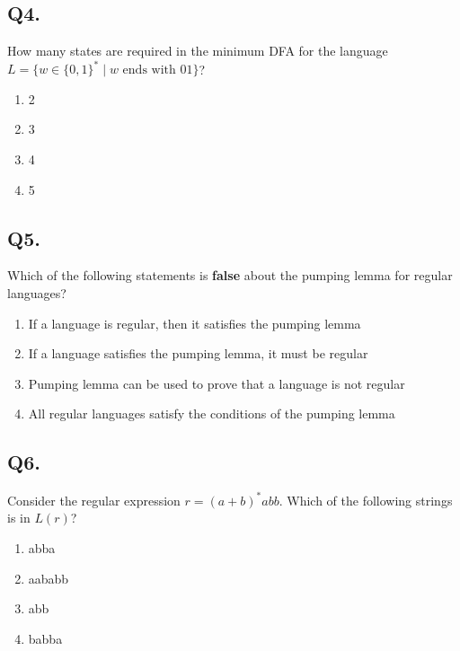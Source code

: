 \vspace{1em}

\subsection*{Q4.}
How many states are required in the minimum DFA for the language $L = \{ w \in \{0,1\}^* \mid w \text{ ends with 01} \}$?

\begin{enumerate}[label=(\alph*)]
    \item 2  
    \item 3  
    \item 4  
    \item 5  
\end{enumerate}

\vspace{1em}

\subsection*{Q5.}
Which of the following statements is \textbf{false} about the pumping lemma for regular languages?

\begin{enumerate}[label=(\alph*)]
    \item If a language is regular, then it satisfies the pumping lemma  
    \item If a language satisfies the pumping lemma, it must be regular  
    \item Pumping lemma can be used to prove that a language is not regular  
    \item All regular languages satisfy the conditions of the pumping lemma  
\end{enumerate}

\vspace{1em}

\subsection*{Q6.}
Consider the regular expression $r = (a+b)^*abb$. Which of the following strings is in $L(r)$?

\begin{enumerate}[label=(\alph*)]
    \item abba  
    \item aababb  
    \item abb  
    \item babba  
\end{enumerate}

